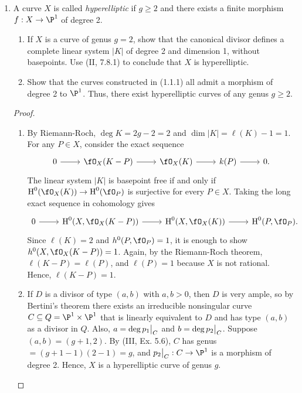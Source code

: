 \documentclass[a4paper]{article}
\begin{document}
\begin{enumerate} [label=\textbf{\arabic*.}, leftmargin=0em]
  \item[\textbf{7.}] A curve $X$ is called \textit{hyperelliptic} if $g \geq 2$ and there exists a finite morphism $f : X \to \P^1$ of degree 2.
        \begin{enumerate} [label=(\alph*)]
          \item If $X$ is a curve of genus $g = 2$, show that the canonical divisor defines a complete linear system $|K|$ of degree 2 and dimension 1, without basepoints. Use (II, 7.8.1) to conclude that $X$ is hyperelliptic.
          \item Show that the curves constructed in (1.1.1) all admit a morphism of degree 2 to $\P^1$. Thus, there exist hyperelliptic curves of any genus $g \geq 2$.
        \end{enumerate}

        \begin{proof} $ $ \vspace{0pt}
          \begin{enumerate} [label=(\alph*), leftmargin=0cm]
            \item By Riemann-Roch, $\deg{K} = 2 g - 2 = 2$ and $\dim{|K|} = \ell(K) - 1 = 1$.
                  For any $P \in X$, consider the exact sequence
                  \[\begin{tikzcd}
                      0 \arrow[r] & \fO_X(K - P) \arrow[r] & \fO_X(K) \arrow[r] & k(P) \arrow[r] & 0.
                    \end{tikzcd} \]
                  The linear system $|K|$ is basepoint free if and only if $\cH^0(\fO_X(K)) \to \cH^0(\fO_P)$ is surjective for every $P \in X$.
                  Taking the long exact sequence in cohomology gives
                  \[\begin{tikzcd}
                      0 \arrow[r] & \cH^0(X, \fO_X(K - P)) \arrow[r] & \cH^0(X, \fO_X(K)) \arrow[r] & \cH^0(P, \fO_P).
                    \end{tikzcd} \]
                  Since $\ell(K) = 2$ and $h^0(P, \fO_P) = 1$, it is enough to show $h^0(X, \fO_X(K - P)) = 1$.
                  Again, by the Riemann-Roch theorem, $\ell(K - P) = \ell(P)$, and $\ell(P) = 1$ because $X$ is not rational.
                  Hence, $\ell(K - P) = 1$.

            \item If $D$ is a divisor of type $(a, b)$ with $a, b > 0$, then $D$ is very ample, so by Bertini's theorem there exists an irreducible nonsingular curve $C \subseteq Q = \P^1 \times \P^1$ that is linearly equivalent to $D$ and has type $(a, b)$ as a divisor in $Q$.
            Also, $a = \deg \restr{p_1}{C}$ and $b = \deg \restr{p_2}{C}$.
            Suppose $(a, b) = (g + 1, 2)$.
            By (III, Ex. 5.6), $C$ has genus $=(g + 1 - 1)(2 - 1) = g$, and $\restr{p_2}{C} : C \to \P^1$ is a morphism of degree 2.
            Hence, $X$ is a hyperelliptic curve of genus $g$.
          \end{enumerate}
        \end{proof}


\end{enumerate}
\end{document}
